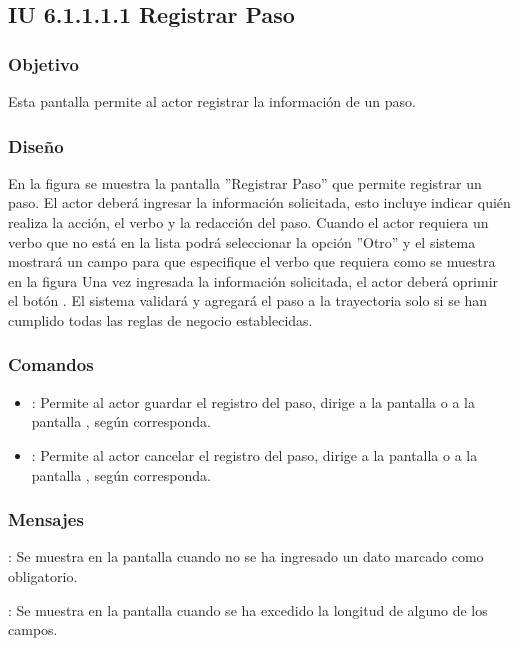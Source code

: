 \subsection{IU 6.1.1.1.1 Registrar Paso}

\subsubsection{Objetivo}
	Esta pantalla permite al actor registrar la información de un paso.
\subsubsection{Diseño}
	En la figura  se muestra la pantalla ''Registrar Paso'' que permite registrar un paso. El actor deberá ingresar la información solicitada, esto incluye indicar quién realiza la acción, el verbo y la redacción del paso.
	Cuando el actor requiera un verbo que no está en la lista podrá seleccionar la opción ''Otro'' y el sistema mostrará un campo para que especifique el verbo que requiera como se muestra en la figura 
	Una vez ingresada la información solicitada, el actor deberá oprimir el botón  . El sistema validará y agregará el paso a la trayectoria solo si se han cumplido todas las reglas de negocio establecidas.

\subsubsection{Comandos}
\begin{itemize}
	\item {}: Permite al actor guardar el registro del paso, dirige a la pantalla  o a la pantalla , según corresponda.
	\item {}: Permite al actor cancelar el registro del paso, dirige a la pantalla  o a la pantalla , según corresponda.
\end{itemize}

\subsubsection{Mensajes}

\begin{Citemize}
	\item {}: Se muestra en la pantalla  cuando no se ha ingresado un dato marcado como obligatorio.
	\item {}: Se muestra en la pantalla  cuando se ha excedido la longitud de alguno de los campos.
\end{Citemize}
